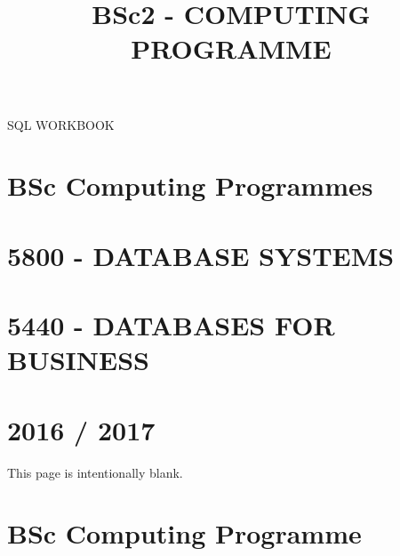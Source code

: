 \documentclass{article}
\title{BSc2 - COMPUTING PROGRAMME}
\begin{document}
\clearpage
SQL WORKBOOK

\section[BSc Computing Programmes]{BSc Computing Programmes}
\section[5800 {}- DATABASE SYSTEMS]{5800 - DATABASE SYSTEMS}
\section[5440 {}- DATABASES FOR BUSINESS]{5440 - DATABASES FOR BUSINESS}

\section[2016 / 2017]{2016 / 2017}
This page is intentionally blank.

\clearpage
\section[BSc Computing Programme]{BSc Computing Programme}
\section[]{}
\end{document}
